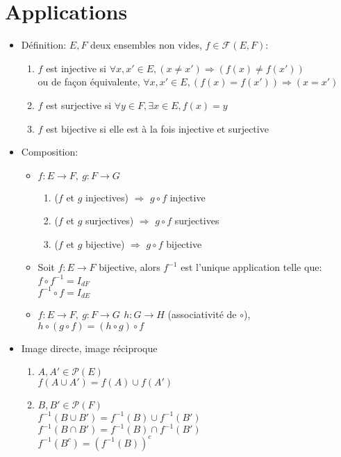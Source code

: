 \documentclass[fleqn]{article}
\begin{document}
\section{Applications}
\begin{itemize}
	\item D\'efinition: \(E, F\) deux ensembles non vides, \( f \in \mathcal{F}(E, F)\):
		\begin{enumerate}
			\item \(f\) est injective si \(\forall x,x' \in E, (x \neq x') \Rightarrow (f(x) \neq f(x'))\) \\
			ou de fa\c{c}on \'equivalente, \(\forall x,x' \in E, (f(x) = f(x')) \Rightarrow (x = x')\)
			\item \(f\) est surjective si \(\forall y \in F, \exists x \in E, f(x) = y\)
			\item \(f\) est bijective si elle est \`a la fois injective et surjective
		\end{enumerate}
	\item Composition:
		\begin{itemize}
			\item \(f: E \rightarrow F,\ g: F \rightarrow G\)
				\begin{enumerate}
					\item (\(f\) et \(g\) injectives) \(\Rightarrow\) \(g \circ f\) injective
					\item (\(f\) et \(g\) surjectives) \(\Rightarrow\) \(g \circ f\) surjectives
					\item (\(f\) et \(g\) bijective) \(\Rightarrow\) \(g \circ f\) bijective
				\end{enumerate}
			\item Soit \(f: E \rightarrow F\) bijective, alors \(f^{-1}\) est l'unique application telle que: \\
				\(f \circ f^{-1} = I_{dF}\) \\
				\(f^{-1} \circ f = I_{dE}\)
			\item \(f: E \rightarrow F,\ g: F \rightarrow G\,\ h: G \rightarrow H\) (associativit\'e de \(\circ\)), \\
				\(h \circ (g \circ f) = (h \circ g) \circ f\)
		\end{itemize}
	\item Image directe, image r\'eciproque
		\begin{enumerate}
			\item \(A, A' \in \mathcal{P}(E)\) \\
				\(f(A \cup A') = f(A) \cup f(A')\)
			\item \(B, B' \in \mathcal{P}(F)\) \\
				\(f^{-1}(B \cup B') = f^{-1}(B) \cup f^{-1}(B')\) \\
				\(f^{-1}(B \cap B') = f^{-1}(B) \cap f^{-1}(B')\) \\
				\(f^{-1}(B^c) = (f^{-1}(B))^c\)
		\end{enumerate}
\end{itemize}
\end{document}
